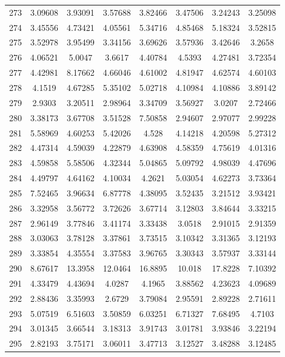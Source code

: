 \begin{center}
\begin{longtable}{cccccccc}
273 & 3.09608 & 3.93091 & 3.57688 & 3.82466 & 3.47506 & 3.24243 & 3.25098\\
274 & 3.45556 & 4.73421 & 4.05561 & 5.34716 & 4.85468 & 5.18324 & 3.52815\\
275 & 3.52978 & 3.95499 & 3.34156 & 3.69626 & 3.57936 & 3.42646 & 3.2658\\
276 & 4.06521 & 5.0047 & 3.6617 & 4.40784 & 4.5393 & 4.27481 & 3.72354\\
277 & 4.42981 & 8.17662 & 4.66046 & 4.61002 & 4.81947 & 4.62574 & 4.60103\\
278 & 4.1519 & 4.67285 & 5.35102 & 5.02718 & 4.10984 & 4.10886 & 3.89142\\
279 & 2.9303 & 3.20511 & 2.98964 & 3.34709 & 3.56927 & 3.0207 & 2.72466\\
280 & 3.38173 & 3.67708 & 3.51528 & 7.50858 & 2.94607 & 2.97077 & 2.99228\\
281 & 5.58969 & 4.60253 & 5.42026 & 4.528 & 4.14218 & 4.20598 & 5.27312\\
282 & 4.47314 & 4.59039 & 4.22879 & 4.63908 & 4.58359 & 4.75619 & 4.01316\\
283 & 4.59858 & 5.58506 & 4.32344 & 5.04865 & 5.09792 & 4.98039 & 4.47696\\
284 & 4.49797 & 4.64162 & 4.10034 & 4.2621 & 5.03054 & 4.62273 & 3.73364\\
285 & 7.52465 & 3.96634 & 6.87778 & 4.38095 & 3.52435 & 3.21512 & 3.93421\\
286 & 3.32958 & 3.56772 & 3.72626 & 3.67714 & 3.12803 & 3.84644 & 3.33215\\
287 & 2.96149 & 3.77846 & 3.41174 & 3.33438 & 3.0518 & 2.91015 & 2.91359\\
288 & 3.03063 & 3.78128 & 3.37861 & 3.73515 & 3.10342 & 3.31365 & 3.12193\\
289 & 3.33854 & 4.35554 & 3.37583 & 3.96765 & 3.30343 & 3.57937 & 3.33144\\
290 & 8.67617 & 13.3958 & 12.0464 & 16.8895 & 10.018 & 17.8228 & 7.10392\\
291 & 4.33479 & 4.43694 & 4.0287 & 4.1965 & 3.88562 & 4.23623 & 4.09689\\
292 & 2.88436 & 3.35993 & 2.6729 & 3.79084 & 2.95591 & 2.89228 & 2.71611\\
293 & 5.07519 & 6.51603 & 3.50859 & 6.03251 & 6.71327 & 7.68495 & 4.7103\\
294 & 3.01345 & 3.66544 & 3.18313 & 3.91743 & 3.01781 & 3.93846 & 3.22194\\
295 & 2.82193 & 3.75171 & 3.06011 & 3.47713 & 3.12527 & 3.48288 & 3.12485\\

\end{longtable}
\end{center}
